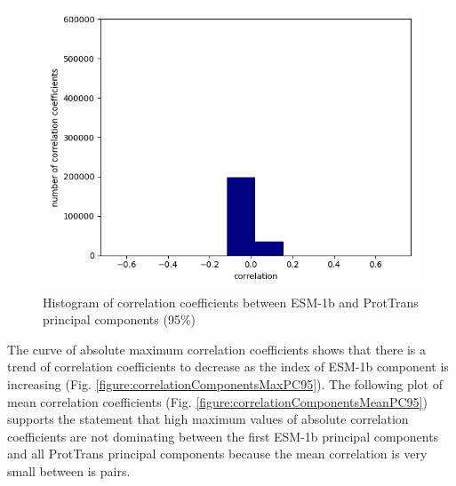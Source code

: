 \documentclass[12pt]{article}
\begin{document}
	\begin{figure}[h!]
		\centering
		\includegraphics[scale=0.85]{validation_small_set_2_joined_PC_95_correlation_hist.png}

		\caption{Histogram of correlation coefficients between ESM-1b 
		and ProtTrans principal components (95\%)}
		\label{figure:correlationComponentsHistoPC95}
	\end{figure}

	\newpage

	The curve of absolute maximum correlation coefficients shows 
	that there is a trend of correlation coefficients to decrease 
	as the index of ESM-1b component is increasing 
	(Fig. \ref{figure:correlationComponentsMaxPC95}). The following 
	plot of mean correlation coefficients 
	(Fig. \ref{figure:correlationComponentsMeanPC95}) supports the 
	statement that high maximum values of absolute correlation 
	coefficients are not dominating between the first ESM-1b 
	principal components and all ProtTrans principal components
	because the mean correlation is very small between is pairs.
\end{document}
